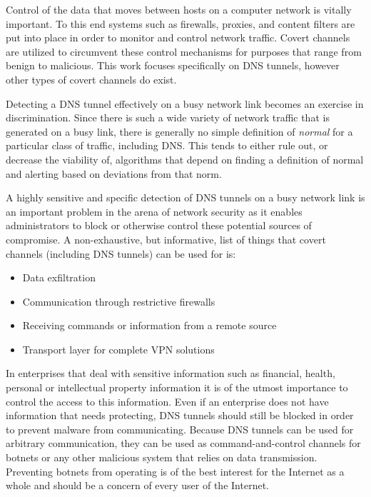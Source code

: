 \documentclass[12pt]{article}
\theoremstyle{remark}
\theoremstyle{definition}
\theoremstyle{definition}
\theoremstyle{definition}
\begin{document}
Control of the data that moves between hosts on a computer network is vitally important. To this end systems
such as firewalls, proxies, and content filters are put into place in order to
monitor and control network traffic. Covert channels
are utilized to circumvent these control mechanisms for purposes that range from
benign to malicious. This work focuses specifically on DNS tunnels, however
other types of covert channels do exist.

Detecting a DNS tunnel effectively on a busy network link becomes an exercise
in discrimination. Since there is such a wide variety of network traffic that
is generated on a busy link, there is generally no simple definition of
\emph{normal} for a particular class of traffic, including DNS. This tends to
either rule out, or decrease the viability of, algorithms that depend on
finding a definition of normal and alerting based on deviations from that norm.

A highly sensitive and specific detection of DNS tunnels on a busy network link
is an important problem in the arena of network security as it enables
administrators to block or otherwise control these potential sources of
compromise. A non-exhaustive, but informative, list of things that covert channels (including DNS tunnels)
can be used for is:

\begin{itemize}
\item Data exfiltration
\item Communication through restrictive firewalls
\item Receiving commands or information from a remote source
\item Transport layer for complete VPN solutions
\end{itemize}

In enterprises that deal with sensitive information such as financial, health,
personal or intellectual property information it is of the utmost importance to
control the access to this information. Even if an enterprise does not have
information that needs protecting, DNS tunnels should still be blocked in order
to prevent malware from communicating. Because DNS tunnels can be used for
arbitrary communication, they can be used as command-and-control channels for
botnets or any other malicious system that relies on data transmission. Preventing
botnets from operating is of the best interest for the Internet as a whole and
should be a concern of every user of the Internet.
\end{document}
